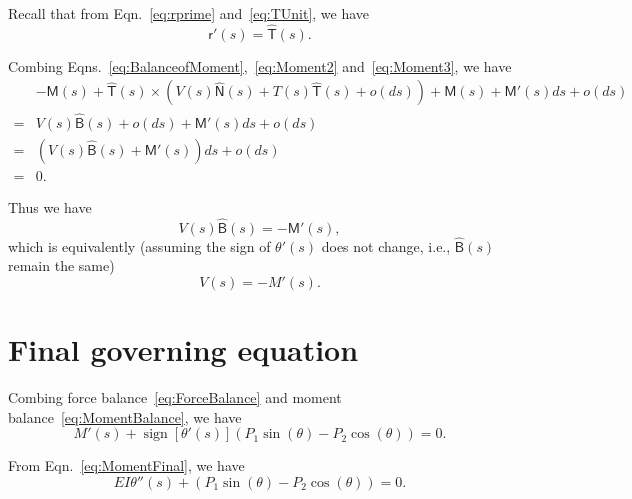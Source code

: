 \documentclass{article}
\newcommand{\bsf}[1]{\boldsymbol{\mathsf{#1}}}
\newcommand{\hb}[1]{\hat{\bsf{#1}}}
\DeclareMathOperator{\sign}{sign}
\begin{document}
Recall that from Eqn.~\eqref{eq:rprime} and~\eqref{eq:TUnit}, we have 
\begin{equation}
\bsf{r}'(s) = \hb{T}(s).
\end{equation}

Combing Eqns.~\eqref{eq:BalanceofMoment},~\eqref{eq:Moment2} and~\eqref{eq:Moment3}, we have
\begin{align}
& -\bsf{M}(s) +  \hb{T}(s) \times \left(V(s) \hb{N}(s) + T(s)\hb{T}(s) + o(ds) \right)+ \bsf{M}(s) + \bsf{M}'(s)ds + o(ds)\\
= & V(s) \hb{B}(s) + o(ds) + \bsf{M}'(s)ds + o(ds) \\
= & \left( V(s) \hb{B}(s) + \bsf{M}'(s) \right)ds + o(ds) \\
= & 0.
\end{align}

Thus we have 
\begin{equation}
V(s) \hb{B}(s)  = - \bsf{M}'(s) ,
\end{equation}
which is equivalently (assuming the sign of $\theta'(s)$ does not change, i.e., $\hb{B}(s)$ remain the same)
\begin{equation}
\label{eq:MomentBalance}
V(s)  = - M'(s) .
\end{equation}


\section{Final governing equation}


Combing force balance~\eqref{eq:ForceBalance} and moment balance~\eqref{eq:MomentBalance}, we have
\begin{equation}
 M'(s)  + \sign\left[\theta'(s)\right]  \left(P_1 \sin(\theta) - P_2 \cos(\theta) \right)= 0 .
\end{equation}

From Eqn.~\eqref{eq:MomentFinal}, we have
\begin{equation}
 E I \theta''(s) + \left(P_1 \sin(\theta) - P_2 \cos(\theta) \right)= 0 .
\end{equation}
\end{document}
